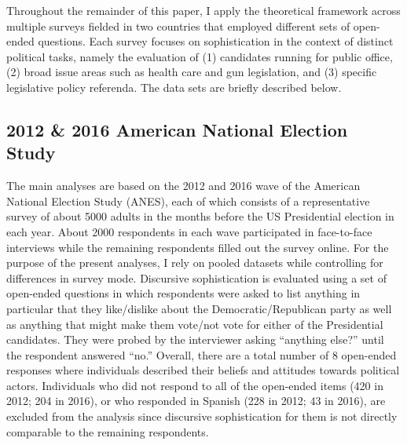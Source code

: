 Throughout the remainder of this paper, I apply the theoretical framework across multiple surveys fielded in two countries that employed different sets of open-ended questions. Each survey focuses on sophistication in the context of distinct political tasks, namely the evaluation of (1) candidates running for public office, (2) broad issue areas such as health care and gun legislation, and (3) specific legislative policy referenda. The data sets are briefly described below.


\subsection*{2012 \& 2016 American National Election Study}
The main analyses are based on the 2012 and 2016 wave of the American National Election Study (ANES), each of which consists of a representative survey of about 5000 adults in the months before the US Presidential election in each year. About 2000 respondents in each wave participated in face-to-face interviews while the remaining respondents filled out the survey online. For the purpose of the present analyses, I rely on pooled datasets while controlling for differences in survey mode. Discursive sophistication is evaluated using a set of open-ended questions in which respondents were asked to list anything in particular that they like/dislike about the Democratic/Republican party as well as anything that might make them vote/not vote for either of the Presidential candidates. They were probed by the interviewer asking ``anything else?'' until the respondent answered ``no.'' Overall, there are a total number of 8 open-ended responses where individuals described their beliefs and attitudes towards political actors. Individuals who did not respond to all of the open-ended items (420 in 2012; 204 in 2016), or who responded in Spanish (228 in 2012; 43 in 2016), are excluded from the analysis since discursive sophistication for them is not directly comparable to the remaining respondents.


